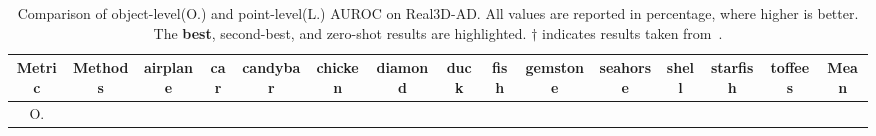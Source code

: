 
\begin{table}[t]
\centering
\caption{Comparison of object-level(O.) and point-level(L.) AUROC on Real3D-AD. All values are reported in percentage, where higher is better. The \colorbox{red!25}{\textbf{best}}, \colorbox{orange!25}{{second-best}}, and \colorbox{cyan!15}{zero-shot} results are highlighted. $\dagger$ indicates results taken from~\cite{zhou2024pointad}.}
\label{table:main}
\renewcommand{\arraystretch}{1.0}
\begin{adjustbox}{max width=\textwidth}
\begin{tabular}{c ccccccccccccc|c}
\toprule
Metric & Methods & airplane & car & candybar & chicken & diamond & duck & fish & gemstone & seahorse & shell & starfish & toffees & Mean \\
\midrule
\multirow{10}{*}{O.}

\end{tabular}
\end{adjustbox}
\end{table}
